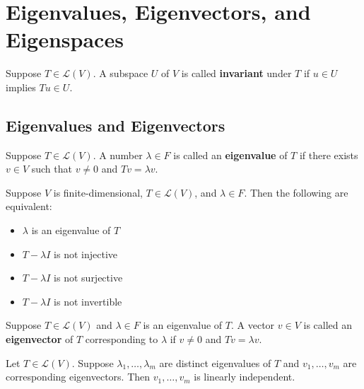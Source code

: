 \documentclass{memoir}
\begin{document}
\chapter{Eigenvalues, Eigenvectors, and Eigenspaces}
\begin{defn}
	Suppose $T \in \mathcal{L}(V)$. A subspace $U$ of $V$ is called \textbf{invariant} under $T$ if $u \in U$ implies $Tu \in U$.
\end{defn}
\section{Eigenvalues and Eigenvectors}
\label{sec:eigenvalues_and_eigenvectors}


\begin{defn}[Eigenvalue]

	Suppose $T  \in \mathcal{L}(V)$. A number $\lambda \in F$  is called an \textbf{eigenvalue} of $T$ if there exists $v \in V$ such that $v\neq 0$ and $Tv = \lambda v$.

\end{defn}
\begin{lemma}
	Suppose $V$ is finite-dimensional, $T \in \mathcal{L}(V)$, and $\lambda \in F$. Then the following are equivalent:
	\begin{itemize}
		\item $\lambda$ is an eigenvalue of $T$ 
		\item $T-\lambda I$ is not injective
		\item $T-\lambda I$ is not surjective
		\item $T-\lambda I$ is not invertible
	\end{itemize}
\end{lemma}
\begin{defn}[Eigenvector]
	Suppose $T \in \mathcal{L}(V)$ and $\lambda \in F$ is an eigenvalue of $T$. A vector $v\in V$ is called an \textbf{eigenvector} of $T$ corresponding to $\lambda$ if $v\neq 0$ and $Tv = \lambda v$.
\end{defn}
\begin{lemma}
	Let $T \in \mathcal{L}(V)$. Suppose $\lambda_1,\ldots,\lambda_m$ are distinct eigenvalues of $T$ and $v_1,\ldots,v_m$ are corresponding eigenvectors. Then $v_1,\ldots,v_m$ is linearly independent.
\end{lemma}
\end{document}
